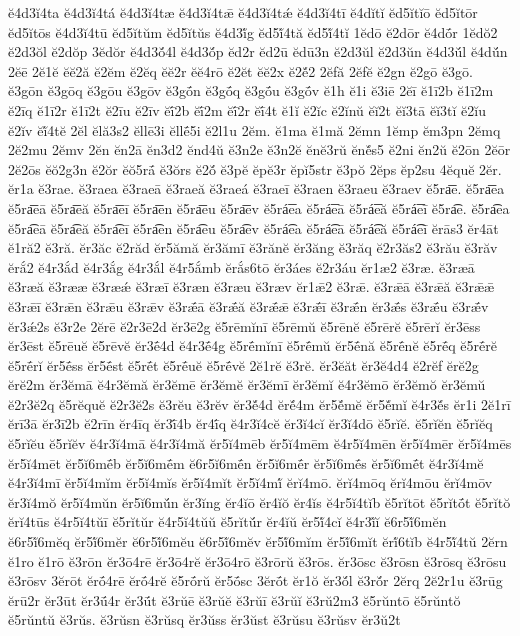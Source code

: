 {ĕ4d3ĭ4ta
ĕ4d3ĭ4tá
ĕ4d3ĭ4tæ
ĕ4d3ĭ4tǣ
ĕ4d3ĭ4tǽ
ĕ4d3ĭ4tī
ĕ4dĭtĭ
ĕd5ĭtĭō
ĕd5ĭtōr
ĕd5ĭtōs
ĕ4d3ĭ4tū
ĕd5ĭtŭm
ĕd5ĭtŭs
ĕ4d3ĭ́g
ĕd5ĭ́4tă
ĕd5ĭ́4tĭ
1ĕdō
ĕ2dōr
ĕ4dṓr
1ĕdŏ2
ĕ2d3ŏl
ĕ2dŏp
3ĕdŏr
ĕ4d3ŏ́4l
ĕ4d3ŏ́p
ĕd2r
ĕd2ū
ĕdū3n
ĕ2d3ŭl
ĕ2d3ŭn
ĕ4d3ŭ́l
ĕ4dŭ́n
2ĕē
2ĕ1ĕ
ĕĕ2ă
ĕ2ĕm
ĕ2ĕq
ĕĕ2r
ĕĕ4rō
ĕ2ĕt
ĕĕ2x
ĕ2ĕ́2
2ĕfă
2ĕfĕ
ĕ2gn
ĕ2gō
ĕ3gō.
ĕ3gōn
ĕ3gōq
ĕ3gōu
ĕ3gōv
ĕ3gṓn
ĕ3gṓq
ĕ3gṓu
ĕ3gṓv
ĕ1h
ĕ1i
ĕ3iē
2ĕī
ĕ1ī2b
ĕ1ī2m
ĕ2īq
ĕ1ī2r
ĕ1ī2t
ĕ2īu
ĕ2īv
ĕī́2b
ĕī́2m
ĕī́2r
ĕī́4t
ĕ1ĭ
ĕ2ĭc
ĕ2ĭnŭ
ĕĭ2t
ĕĭ3tā
ĕĭ3tĭ
ĕ2ĭu
ĕ2ĭv
ĕĭ́4tĕ
2ĕl
ĕlă3s2
ĕllē3i
ĕllḗ5i
ĕ2l1u
2ĕm.
ĕ1ma
ĕ1mă
2ĕmn
1ĕmp
ĕm3pn
2ĕmq
2ĕ2mu
2ĕmv
2ĕn
ĕn2ā
ĕn3d2
ĕnd4ŭ
ĕ3n2e
ĕ3n2ĕ
ĕnĕ3rŭ
ĕnĕ́s5
ĕ2ni
ĕn2ŭ
ĕ2ōn
2ĕōr
2ĕ2ōs
ĕŏ2g3n
ĕ2ŏr
ĕŏ5rā́
ĕ3ŏrs
ĕ2ŏ́
ĕ3pĕ
ĕpĕ3r
ĕpĭ5str
ĕ3pŏ
2ĕps
ĕp2su
4ĕquĕ
2ĕr.
ĕr1a
ĕ3rae.
ĕ3raea
ĕ3raeā
ĕ3raeă
ĕ3raeá
ĕ3raeī
ĕ3raen
ĕ3raeu
ĕ3raev
ĕ5ra͞e.
ĕ5ra͞ea
ĕ5ra͞eā
ĕ5ra͞eă
ĕ5ra͞eī
ĕ5ra͞en
ĕ5ra͞eu
ĕ5ra͞ev
ĕ5rá͞ea
ĕ5rá͞eā
ĕ5rá͞eă
ĕ5rá͞eī
ĕ5ra͡e.
ĕ5ra͡ea
ĕ5ra͡eā
ĕ5ra͡eă
ĕ5ra͡eī
ĕ5ra͡en
ĕ5ra͡eu
ĕ5ra͡ev
ĕ5rá͡ea
ĕ5rá͡eā
ĕ5rá͡eă
ĕ5rá͡eī
ĕrās3
ĕr4āt
ĕ1ră2
ĕ3ră.
ĕr3ăc
ĕ2răd
ĕr5ămă
ĕr3ămī
ĕ3rănĕ
ĕr3ăng
ĕ3răq
ĕ2r3ăs2
ĕ3rău
ĕ3răv
ĕrắ2
ĕ4r3ắd
ĕ4r3ắg
ĕ4r3ắl
ĕ4r5ắmb
ĕrắs6tō
ĕr3áes
ĕ2r3áu
ĕr1æ2
ĕ3ræ.
ĕ3ræā
ĕ3ræă
ĕ3rææ
ĕ3ræǽ
ĕ3ræī
ĕ3ræn
ĕ3ræu
ĕ3ræv
ĕr1ǣ2
ĕ3rǣ.
ĕ3rǣā
ĕ3rǣă
ĕ3rǣǣ
ĕ3rǣī
ĕ3rǣn
ĕ3rǣu
ĕ3rǣv
ĕ3rǣ́ā
ĕ3rǣ́ă
ĕ3rǣ́ǣ
ĕ3rǣ́ī
ĕ3rǣ́n
ĕr3ǣ́s
ĕ3rǣ́u
ĕ3rǣ́v
ĕr3ǽ2s
ĕ3r2e
2ĕrē
ĕ2r3ē2d
ĕr3ē2g
ĕ5rēmĭnī
ĕ5rēmŭ
ĕ5rēnĕ
ĕ5rērĕ
ĕ5rērĭ
ĕr3ēss
ĕr3ēst
ĕ5rēuĕ
ĕ5rēvĕ
ĕr3ḗ4d
ĕ4r3ḗ4g
ĕ5rḗmĭnī
ĕ5rḗmŭ
ĕr5ḗnă
ĕ5rḗnĕ
ĕ5rḗq
ĕ5rḗrĕ
ĕ5rḗrĭ
ĕr5ḗss
ĕr5ḗst
ĕ5rḗt
ĕ5rḗuĕ
ĕ5rḗvĕ
2ĕ1rĕ
ĕ3rĕ.
ĕr3ĕăt
ĕr3ĕ4d4
ĕ2rĕf
ĕrĕ2g
ĕrĕ2m
ĕr3ĕmā
ĕ4r3ĕmă
ĕr3ĕmē
ĕr3ĕmĕ
ĕr3ĕmī
ĕr3ĕmĭ
ĕ4r3ĕmō
ĕr3ĕmŏ
ĕr3ĕmŭ
ĕ2r3ĕ2q
ĕ5rĕquĕ
ĕ2r3ĕ2s
ĕ3rĕu
ĕ3rĕv
ĕr3ĕ́4d
ĕrĕ́4m
ĕr5ĕ́mĕ
ĕr5ĕ́mĭ
ĕ4r3ĕ́s
ĕr1i
2ĕ1rī
ĕrī3ā
ĕr3ī2b
ĕ2rīn
ĕr4īq
ĕr3ī́4b
ĕr4ī́q
ĕ4r3ĭ4cĕ
ĕr3ĭ4cĭ
ĕr3ĭ4dō
ĕ5rĭĕ.
ĕ5rĭĕn
ĕ5rĭĕq
ĕ5rĭĕu
ĕ5rĭĕv
ĕ4r3ĭ4mā
ĕ4r3ĭ4mă
ĕr5ĭ4mēb
ĕr5ĭ4mēm
ĕ4r5ĭ4mēn
ĕr5ĭ4mēr
ĕr5ĭ4mēs
ĕr5ĭ4mēt
ĕr5ĭ6mḗb
ĕr5ĭ6mḗm
ĕ6r5ĭ6mḗn
ĕr5ĭ6mḗr
ĕr5ĭ6mḗs
ĕr5ĭ6mḗt
ĕ4r3ĭ4mĕ
ĕ4r3ĭ4mī
ĕr5ĭ4mĭm
ĕr5ĭ4mĭs
ĕr5ĭ4mĭt
ĕr5ĭ4mĭ́
ĕrĭ4mō.
ĕrĭ4mōq
ĕrĭ4mōu
ĕrĭ4mōv
ĕr3ĭ4mŏ
ĕr5ĭ4mŭn
ĕr5ĭ6mŭ́n
ĕr3ĭng
ĕr4ĭō
ĕr4ĭŏ
ĕr4ĭs
ĕ4r5ĭ4tĭb
ĕ5rĭtōt
ĕ5rĭtṓt
ĕ5rĭtŏ
ĕrĭ4tūs
ĕ4r5ĭ4tŭī
ĕ5rĭtŭr
ĕ4r5ĭ4tŭŭ
ĕ5rĭtŭ́r
ĕr4ĭŭ
ĕr5ĭ́4cĭ
ĕ4r3ĭ́ĭ
ĕ6r5ĭ́6mĕn
ĕ6r5ĭ́6mĕq
ĕr5ĭ́6mĕr
ĕ6r5ĭ́6mĕu
ĕ6r5ĭ́6mĕv
ĕr5ĭ́6mĭm
ĕr5ĭ́6mĭt
ĕrĭ́6tĭb
ĕ4r5ĭ́4tŭ
2ĕrn
ĕ1ro
ĕ1rō
ĕ3rōn
ĕr3ō4rē
ĕr3ō4rĕ
ĕr3ō4rō
ĕ3rōrŭ
ĕ3rōs.
ĕr3ōsc
ĕ3rōsn
ĕ3rōsq
ĕ3rōsu
ĕ3rōsv
3ĕrōt
ĕrṓ4rē
ĕrṓ4rĕ
ĕ5rṓrŭ
ĕr5ṓsc
3ĕrṓt
ĕr1ŏ
ĕr3ŏ́l
ĕ3rŏ́r
2ĕrq
2ĕ2r1u
ĕ3rūg
ĕrū2r
ĕr3ūt
ĕr3ū́4r
ĕr3ū́t
ĕ3rŭē
ĕ3rŭĕ
ĕ3rŭī
ĕ3rŭĭ
ĕ3rŭ2m3
ĕ5rŭntō
ĕ5rŭntŏ
ĕ5rŭntŭ
ĕ3rŭs.
ĕ3rŭsn
ĕ3rŭsq
ĕr3ŭss
ĕr3ŭst
ĕ3rŭsu
ĕ3rŭsv
ĕr3ŭ2t
}
